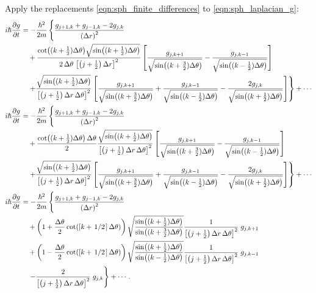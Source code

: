 \documentclass[12pt]{article}
\numberwithin{equation}{section}
\begin{document}
Apply the replacements \eqref{eqn:sph_finite_differences} to \eqref{eqn:sph_laplacian_g}:
\begin{align}
i \hbar \pdv{g}{t} &= -\frac{\hbar^2}{2m} \left\lbrace      \frac{g_{j+1, k} + g_{j-1, k} - 2g_{j,k}}{\left(\Delta r\right)^2} \right. \nonumber \\
&\quad + \frac{\cot((k+\frac{1}{2}) \Delta \theta) \sqrt{\sin((k+\frac{1}{2}) \Delta \theta)}}{2 \, \Delta \theta \, \left[\left(j+\frac{1}{2}\right) \Delta r\right]^2} \left[  \frac{g_{j, k+1}}{\sqrt{\sin((k+\frac{3}{2}) \Delta \theta)}} - \frac{g_{j, k-1}}{\sqrt{\sin((k-\frac{1}{2}) \Delta \theta)}}   \right] \nonumber \\
&\quad \left.   + \frac{\sqrt{\sin((k+\frac{1}{2}) \Delta \theta)}}{\left[\left(j+\frac{1}{2}\right) \Delta r \, \Delta \theta\right]^2} \left[  \frac{g_{j, k+1}}{\sqrt{\sin((k+\frac{3}{2}) \Delta \theta)}} + \frac{g_{j, k-1}}{\sqrt{\sin((k-\frac{1}{2}) \Delta \theta)}} - \frac{2g_{j, k}}{\sqrt{\sin((k+\frac{1}{2}) \Delta \theta)}}  \right]        \right\rbrace + \cdots \nonumber \\
i \hbar \pdv{g}{t} &= -\frac{\hbar^2}{2m} \left\lbrace      \frac{g_{j+1, k} + g_{j-1, k} - 2g_{j,k}}{\left(\Delta r\right)^2} \right. \nonumber \\
&\quad + \frac{\cot((k+\frac{1}{2}) \Delta \theta) \, \Delta\theta}{2}   \frac{ \sqrt{\sin((k+\frac{1}{2}) \Delta \theta)}}{\left[\left(j+\frac{1}{2}\right) \Delta r \, \Delta \theta\right]^2} \left[  \frac{g_{j, k+1}}{\sqrt{\sin((k+\frac{3}{2}) \Delta \theta)}} - \frac{g_{j, k-1}}{\sqrt{\sin((k-\frac{1}{2}) \Delta \theta)}}   \right] \nonumber \\
&\quad \left.   + \frac{\sqrt{\sin((k+\frac{1}{2}) \Delta \theta)}}{\left[\left(j+\frac{1}{2}\right) \Delta r \, \Delta \theta\right]^2} \left[  \frac{g_{j, k+1}}{\sqrt{\sin((k+\frac{3}{2}) \Delta \theta)}} + \frac{g_{j, k-1}}{\sqrt{\sin((k-\frac{1}{2}) \Delta \theta)}} - \frac{2g_{j, k}}{\sqrt{\sin((k+\frac{1}{2}) \Delta \theta)}}  \right]        \right\rbrace + \cdots \nonumber \\
i \hbar \pdv{g}{t} &= -\frac{\hbar^2}{2m} \left\lbrace      \frac{g_{j+1, k} + g_{j-1, k} - 2g_{j,k}}{\left(\Delta r\right)^2} \right. \nonumber \\
&\quad + \left( 1 +  \frac{\Delta\theta}{2}  \cot(\left[k+\flatfrac{1}{2}\right] \Delta \theta)   \right)       \sqrt{\frac{ \sin((k+\frac{1}{2}) \Delta \theta)}{\sin((k+\frac{3}{2}) \Delta \theta)}}      \frac{1}{\left[\left(j+\frac{1}{2}\right) \Delta r \, \Delta \theta\right]^2} \; g_{j, k+1} \nonumber \\
&\quad + \left( 1 -  \frac{\Delta\theta}{2}  \cot(\left[k+\flatfrac{1}{2}\right] \Delta \theta)   \right)       \sqrt{\frac{ \sin((k+\frac{1}{2}) \Delta \theta)}{\sin((k-\frac{1}{2}) \Delta \theta)}}      \frac{1}{\left[\left(j+\frac{1}{2}\right) \Delta r \, \Delta \theta\right]^2} \; g_{j, k-1} \nonumber \\
&\left. \quad - \frac{2}{\left[\left(j+\frac{1}{2}\right) \Delta r \, \Delta \theta\right]^2} \; g_{j, k} \right\rbrace + \cdots.
\end{align}
\end{document}
